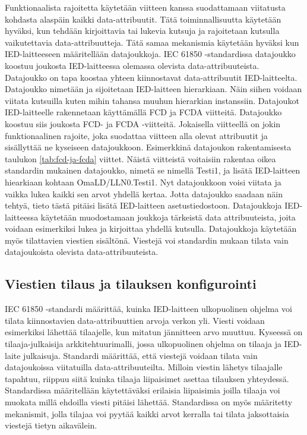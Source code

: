 Funktionaalista rajoitetta käytetään viitteen kanssa suodattamaan viitatusta kohdasta alaspäin kaikki data-attribuutit. Tätä toiminnallisuutta käytetään hyväksi, kun tehdään kirjoittavia tai lukevia kutsuja ja rajoitetaan kutsulla vaikutettavia data-attribuutteja. Tätä samaa mekanismia käytetään hyväksi kun IED-laitteeseen määritellään datajoukkoja. IEC 61850 -standardissa datajoukko koostuu joukosta IED-laitteessa olemassa olevista data-attribuuteista. Datajoukko on tapa koostaa yhteen kiinnostavat data-attribuutit IED-laitteelta. Datajoukko nimetään ja sijoitetaan IED-laitteen hierarkiaan. Näin siihen voidaan viitata kutsuilla kuten mihin tahansa muuhun hierarkian instanssiin. Datajoukot IED-laitteelle rakennetaan käyttämällä FCD ja FCDA viitteitä. Datajoukko koostuu siis joukosta FCD- ja FCDA -viitteitä. Jokaisella viitteellä on jokin funktionaalinen rajoite, joka suodattaa viitteen alla olevat attribuutit ja sisällyttää ne kyseiseen datajoukkoon. Esimerkkinä datajoukon rakentamisesta taulukon \ref{tab:fcd-ja-fcda} viittet. Näistä viitteistä voitaisiin rakentaa oikea standardin mukainen datajoukko, nimetä se nimellä Testi1, ja lisätä IED-laitteen hiearkiaan kohtaan OmaLD/LLN0.Testi1. Nyt datajoukkoon voisi viitata ja vaikka lukea kaikki sen arvot yhdellä kertaa. Jotta datajoukko saadaan näin tehtyä, tieto tästä pitäisi lisätä IED-laitteen asetustiedostoon. Datajoukkoja IED-laitteessa käytetään muodostamaan joukkoja tärkeistä data attribuuteista, joita voidaan esimerkiksi lukea ja kirjoittaa yhdellä kutsulla. Datajoukkoja käytetään myös tilattavien viestien sisältönä. Viestejä voi standardin mukaan tilata vain datajoukoista olevista data-attribuuteista. \cite[s.~61--68]{IEC61850-7-2}


\subsection{Viestien tilaus ja tilauksen konfigurointi}
\label{ch:viestien-tilaus-ja-tilauksen-konfigurointi}
IEC 61850 -standardi määrittää, kuinka IED-laitteen ulkopuolinen ohjelma voi tilata kiinnostavien data-attribuuttien arvoja verkon yli. Viesti voidaan esimerkiksi lähettää tilaajelle, kun mitatun jännitteen arvo muuttuu. Kyseessä on tilaaja-julkaisija arkkitehtuurimalli, jossa ulkopuolinen ohjelma on tilaaja ja IED-laite julkaisuja. Standardi määrittää, että viestejä voidaan tilata vain datajoukoissa viitatuilla data-attribuuteilta. Milloin viestin lähetys tilaajalle tapahtuu, riippuu siitä kuinka tilaaja liipaisimet asettaa tilauksen yhteydessä. Standardissa määritellään käytettäväksi erilaisia liipaisimia joilla tilaaja voi muokata millä ehdoilla viesti pitäisi lähettää. Standardissa on myös määritetty mekanismit, jolla tilajaa voi pyytää kaikki arvot kerralla tai tilata jaksottaisia viestejä tietyn aikavälein.

